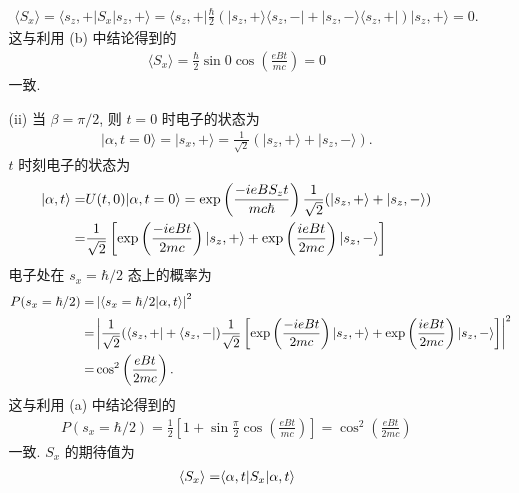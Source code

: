 \documentclass{assignment}
\begin{document}
\begin{sol}
\begin{itemize}
\begin{itemize}
\begin{align}
                \langle S_x\rangle=\langle s_z,+\rvert S_x\lvert s_z,+\rangle=\langle s_z,+\rvert\frac{\hbar}{2}(\lvert s_z,+\rangle\langle s_z,-\rvert+\lvert s_z,-\rangle\langle s_z,+\rvert)\lvert s_z,+\rangle=0.
            \end{align}
            这与利用 (b) 中结论得到的
            \begin{align}
                \langle S_x\rangle=\frac{\hbar}{2}\sin 0\cos\left(\frac{eBt}{mc}\right)=0
            \end{align}
            一致.
            \item[(ii)] 当 $\beta=\pi/2$, 则 $t=0$ 时电子的状态为
            \begin{align}
                \lvert\alpha,t=0\rangle=\lvert s_x,+\rangle=\frac{1}{\sqrt{2}}(\lvert s_z,+\rangle+\lvert s_z,-\rangle).
            \end{align}
            $t$ 时刻电子的状态为
            \begin{align}
                \notag\lvert\alpha,t\rangle=&U(t,0)\lvert\alpha,t=0\rangle=\exp\left(\frac{-ieBS_zt}{mc\hbar}\right)\frac{1}{\sqrt{2}}(\lvert s_z,+\rangle+\lvert s_z,-\rangle)\\
                =&\frac{1}{\sqrt{2}}\left[\exp\left(\frac{-ieBt}{2mc}\right)\lvert s_z,+\rangle+\exp\left(\frac{ieBt}{2mc}\right)\lvert s_z,-\rangle\right]
            \end{align}
            电子处在 $s_x=\hbar/2$ 态上的概率为
            \begin{align}
                \notag P(s_x=\hbar/2)=&\left\lvert\langle s_x=\hbar/2\vert\alpha,t\rangle\right\rvert^2\\
                \notag=&\left\lvert\frac{1}{\sqrt{2}}(\langle s_z,+\rvert+\langle s_z,-\rvert)\frac{1}{\sqrt{2}}\left[\exp\left(\frac{-ieBt}{2mc}\right)\lvert s_z,+\rangle+\exp\left(\frac{ieBt}{2mc}\right)\lvert s_z,-\rangle\right]\right\rvert^2\\
                =&\cos^2\left(\frac{eBt}{2mc}\right).
            \end{align}
            这与利用 (a) 中结论得到的
            \begin{align}
                P(s_x=\hbar/2)=\frac{1}{2}\left[1+\sin\frac{\pi}{2}\cos\left(\frac{eBt}{mc}\right)\right]=\cos^2\left(\frac{eBt}{2mc}\right)
            \end{align}
            一致. $S_x$ 的期待值为
            \begin{align}
                \notag\langle S_x\rangle=&\langle\alpha,t\rvert S_x\lvert\alpha,t\rangle\\

\end{align}
\end{itemize}
\end{itemize}
\end{sol}
\end{document}
